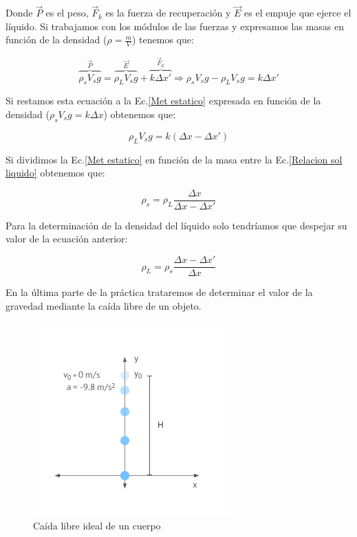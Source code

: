 \documentclass[a4paper,12pt,titlepage]{article}
\begin{document}
Donde $\vec{P}$ es el peso, $\vec{F}_k$ es la fuerza de recuperación y $\vec{E}$ es el empuje que ejerce el líquido. Si trabajamos con los módulos de las fuerzas y expresamos las masas en función de la densidad ($\rho = \frac{m}{V}$) tenemos que:

\begin{equation}
    \overbrace{\rho_s V_s g}^{\vec{P}} = \overbrace{\rho_L V_s g}^{\vec{E}} + \overbrace{k \Delta x'}^{\vec{F}_k} \Rightarrow \rho_s V_s g - \rho_L V_s g = k\Delta x'
\end{equation}

Si restamos esta ecuación a la Ec.\ref{Met estatico} expresada en función de la densidad ($\rho_s V_s g = k\Delta x$) obtenemos que:

\begin{equation}
    \rho_L V_s g = k (\Delta x -\Delta x')
    \label{Relacion sol liquido}
\end{equation}

Si dividimos la Ec.\ref{Met estatico} en función de la masa entre la Ec.\ref{Relacion sol liquido} obtenemos que:

\begin{equation}
    \rho_s = \rho_L \frac{\Delta x}{\Delta x - \Delta x'}
    \label{Densidad sol}
\end{equation}

Para la determinación de la densidad del líquido solo tendríamos que despejar su valor de la ecuación anterior:

\begin{equation}
    \rho_L = \rho_s \frac{\Delta x- \Delta x'}{\Delta x}
    \label{Densidad liq}
\end{equation}

En la última parte de la práctica trataremos de determinar el valor de la gravedad mediante la caída libre de un objeto.

\begin{figure}[h!]
    \centering
    \includegraphics[width=0.5\linewidth]{Images/caidalibre.png}
    \caption{Caída libre ideal de un cuerpo}
\end{figure}
\end{document}
